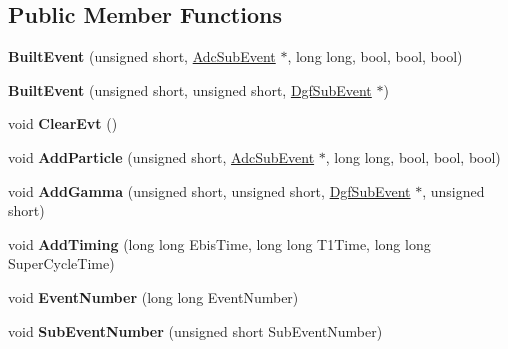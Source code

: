 \subsection*{Public Member Functions}
\begin{DoxyCompactItemize}
\item 
\mbox{\label{class_built_event_a6191c8fda84fcc3ab2ce774db393db18}} 
{\bfseries Built\+Event} (unsigned short, \hyperlink{class_adc_sub_event}{Adc\+Sub\+Event} $\ast$, long long, bool, bool, bool)
\item 
\mbox{\label{class_built_event_ae9580318d1344acfc33d4e603d31f058}} 
{\bfseries Built\+Event} (unsigned short, unsigned short, \hyperlink{class_dgf_sub_event}{Dgf\+Sub\+Event} $\ast$)
\item 
\mbox{\label{class_built_event_a332515d3db4d4e0b324a4584090d78e3}} 
void {\bfseries Clear\+Evt} ()
\item 
\mbox{\label{class_built_event_a3f521359cd9e884f3eaba119ef8f6102}} 
void {\bfseries Add\+Particle} (unsigned short, \hyperlink{class_adc_sub_event}{Adc\+Sub\+Event} $\ast$, long long, bool, bool, bool)
\item 
\mbox{\label{class_built_event_ae7e96358bcd4b95f4908ed0eff1be292}} 
void {\bfseries Add\+Gamma} (unsigned short, unsigned short, \hyperlink{class_dgf_sub_event}{Dgf\+Sub\+Event} $\ast$, unsigned short)
\item 
\mbox{\label{class_built_event_a4c1868b1cd5d9e2e143db1feebe51b40}} 
void {\bfseries Add\+Timing} (long long Ebis\+Time, long long T1\+Time, long long Super\+Cycle\+Time)
\item 
\mbox{\label{class_built_event_ad3dfcf9a541516c8c9bc391ca91e8748}} 
void {\bfseries Event\+Number} (long long Event\+Number)
\item 
\mbox{\label{class_built_event_a71a6879f3cb5a2d2714c17152c569c41}} 
void {\bfseries Sub\+Event\+Number} (unsigned short Sub\+Event\+Number)
\item 
\mbox{\label{class_built_event_a1e50f0e800d504e04dbf62ddd9ba9b0d}} 

\end{DoxyCompactItemize}
